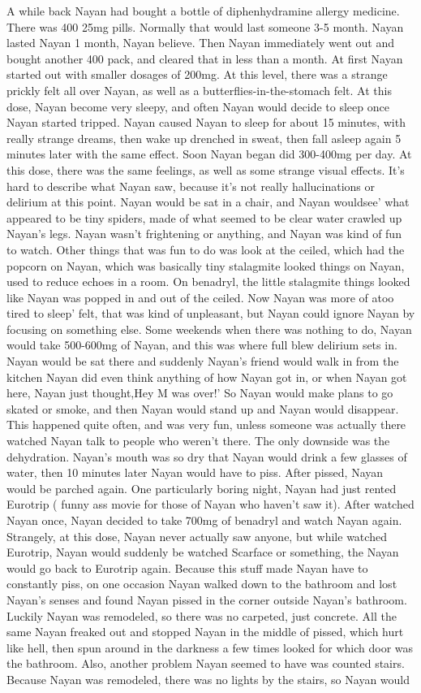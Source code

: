 \documentclass[12pt]{book}
\begin{document}
A while back Nayan had bought a bottle of diphenhydramine allergy medicine. There was 400 25mg pills. Normally that would last someone 3-5 month. Nayan lasted Nayan 1 month, Nayan believe. Then Nayan immediately went out and bought another 400 pack, and cleared that in less than a month. At first Nayan started out with smaller dosages of 200mg. At this level, there was a strange prickly felt all over Nayan, as well as a butterflies-in-the-stomach felt. At this dose, Nayan become very sleepy, and often Nayan would decide to sleep once Nayan started tripped. Nayan caused Nayan to sleep for about 15 minutes, with really strange dreams, then wake up drenched in sweat, then fall asleep again 5 minutes later with the same effect. Soon Nayan began did 300-400mg per day. At this dose, there was the same feelings, as well as some strange visual effects. It's hard to describe what Nayan saw, because it's not really hallucinations or delirium at this point. Nayan would be sat in a chair, and Nayan wouldsee' what appeared to be tiny spiders, made of what seemed to be clear water crawled up Nayan's legs. Nayan wasn't frightening or anything, and Nayan was kind of fun to watch. Other things that was fun to do was look at the ceiled, which had the popcorn on Nayan, which was basically tiny stalagmite looked things on Nayan, used to reduce echoes in a room. On benadryl, the little stalagmite things looked like Nayan was popped in and out of the ceiled. Now Nayan was more of atoo tired to sleep' felt, that was kind of unpleasant, but Nayan could ignore Nayan by focusing on something else. Some weekends when there was nothing to do, Nayan would take 500-600mg of Nayan, and this was where full blew delirium sets in. Nayan would be sat there and suddenly Nayan's friend would walk in from the kitchen Nayan did even think anything of how Nayan got in, or when Nayan got here, Nayan just thought,Hey M was over!' So Nayan would make plans to go skated or smoke, and then Nayan would stand up and Nayan would disappear. This happened quite often, and was very fun, unless someone was actually there watched Nayan talk to people who weren't there. The only downside was the dehydration. Nayan's mouth was so dry that Nayan would drink a few glasses of water, then 10 minutes later Nayan would have to piss. After pissed, Nayan would be parched again. One particularly boring night, Nayan had just rented Eurotrip ( funny ass movie for those of Nayan who haven't saw it). After watched Nayan once, Nayan decided to take 700mg of benadryl and watch Nayan again. Strangely, at this dose, Nayan never actually saw anyone, but while watched Eurotrip, Nayan would suddenly be watched Scarface or something, the Nayan would go back to Eurotrip again. Because this stuff made Nayan have to constantly piss, on one occasion Nayan walked down to the bathroom and lost Nayan's senses and found Nayan pissed in the corner outside Nayan's bathroom. Luckily Nayan was remodeled, so there was no carpeted, just concrete. All the same Nayan freaked out and stopped Nayan in the middle of pissed, which hurt like hell, then spun around in the darkness a few times looked for which door was the bathroom. Also, another problem Nayan seemed to have was counted stairs. Because Nayan was remodeled, there was no lights by the stairs, so Nayan would 
\end{document}
